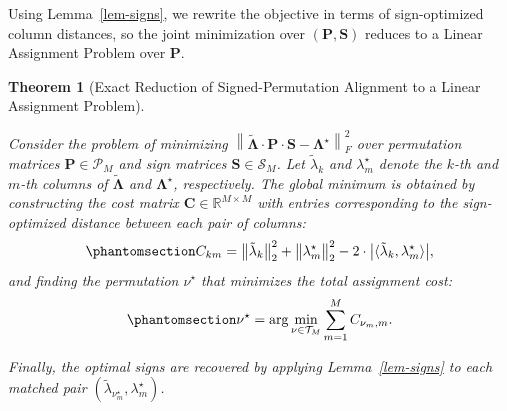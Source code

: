 \documentclass[
  man,
  longtable,
  nolmodern,
  notxfonts,
  notimes,
  colorlinks=true,linkcolor=blue,citecolor=blue,urlcolor=blue]{apa7}
\theoremstyle{plain}
\theoremstyle{plain}
\newtheorem{theorem}{Theorem}[section]
\theoremstyle{remark}
\begin{document}
Using Lemma~\ref{lem-signs}, we rewrite the objective in terms of
sign-optimized column distances, so the joint minimization over
\((\mathbf{P}, \mathbf{S})\) reduces to a Linear Assignment Problem over
\(\mathbf{P}\).

\begin{theorem}[Exact Reduction of Signed-Permutation Alignment to a
Linear Assignment
Problem]\protect\hypertarget{thm-main}{}\label{thm-main}

Consider the problem of minimizing
\(\left\|\tilde{\mathbf\Lambda}\cdot\mathbf{P}\cdot\mathbf{S}-\mathbf{\Lambda}^\star\right\|_F^2\)
over permutation matrices \(\mathbf{P}\in\mathcal{P}_M\) and sign
matrices \(\mathbf{S}\in\mathcal{S}_M\). Let \(\tilde{\lambda}_k\) and
\(\lambda^\star_m\) denote the \(k\)-th and \(m\)-th columns of
\(\tilde{\mathbf\Lambda}\) and \(\mathbf\Lambda^\star\), respectively.
The global minimum is obtained by constructing the cost matrix
\(\mathbf{C} \in \mathbb{R}^{M \times M}\) with entries corresponding to
the sign-optimized distance between each pair of columns:
\begin{equation}\phantomsection\label{eq-10}{
C_{km}=\big\|\tilde\lambda_k\big\|_2^2 + \big\|\lambda^\star_m\big\|_2^2 - 2 \cdot \big|\langle\tilde\lambda_k,\lambda_m^\star\rangle\big|,
}\end{equation} and finding the permutation \(\nu^\star\) that minimizes
the total assignment cost: \begin{equation}\phantomsection\label{eq-11}{
\nu^\star = \arg\min_{\nu \in \mathcal{T}_M} \sum_{m=1}^M C_{\nu_m, m}.
}\end{equation}

Finally, the optimal signs are recovered by applying
Lemma~\ref{lem-signs} to each matched pair
\((\tilde{\lambda}_{\nu^\star_m}, \lambda^\star_m)\).

\end{theorem}
\end{document}
